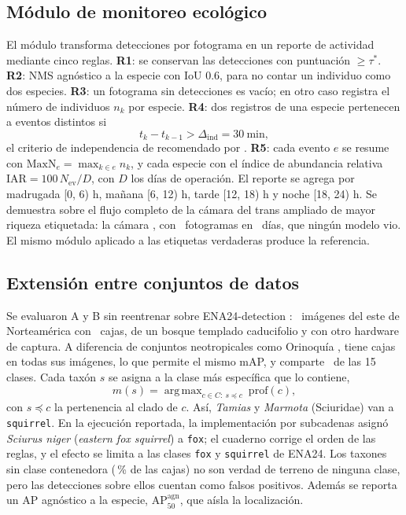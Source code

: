\documentclass{article}
\DeclareMathOperator*{\argmax}{arg\,max}
\begin{document}
\subsection{Módulo de monitoreo ecológico}
\label{sec:monitoreo}
El módulo transforma detecciones por fotograma en un reporte de actividad mediante cinco reglas. \textbf{R1}: se conservan las detecciones con puntuación \(\ge \tau^\ast\). \textbf{R2}: NMS agnóstico a la especie con IoU 0.6, para no contar un individuo como dos especies. \textbf{R3}: un fotograma sin detecciones es vacío; en otro caso registra el número de individuos \(n_k\) por especie. \textbf{R4}: dos registros de una especie pertenecen a eventos distintos si
\begin{equation}
  t_k - t_{k-1} > \Delta_{\mathrm{ind}} = 30\ \text{min},
  \label{eq:evento}
\end{equation}
el criterio de independencia de \textcite{obrien2003} recomendado por \textcite{meek2014}. \textbf{R5}: cada evento \(e\) se resume con \(\mathrm{MaxN}_e = \max_{k\in e} n_k\), y cada especie con el índice de abundancia relativa \(\mathrm{IAR} = 100\, N_{\mathrm{ev}}/D\), con \(D\) los días de operación. El reporte se agrega por madrugada [0, 6) h, mañana [6, 12) h, tarde [12, 18) h y noche [18, 24) h. Se demuestra sobre el flujo completo de la cámara del trans ampliado de mayor riqueza etiquetada: la cámara \locDemo, con \fotogramasDemo\ fotogramas en \diasDemo\ días, que ningún modelo vio. El mismo módulo aplicado a las etiquetas verdaderas produce la referencia.

\subsection{Extensión entre conjuntos de datos}
\label{sec:ena24}
Se evaluaron A y B sin reentrenar sobre ENA24-detection \parencite{yousif2019}: \nEna\ imágenes del este de Norteamérica con \nCajasEna\ cajas, de un bosque templado caducifolio y con otro hardware de captura. A diferencia de conjuntos neotropicales como Orinoquía \parencite{velez2023}, tiene cajas en todas sus imágenes, lo que permite el mismo mAP, y comparte \nClasesEna\ de las 15 clases. Cada taxón \(s\) se asigna a la clase más específica que lo contiene,
\begin{equation}
  m(s) = \argmax_{c \in C:\ s \preceq c}\ \mathrm{prof}(c),
  \label{eq:mapeo}
\end{equation}
con \(s \preceq c\) la pertenencia al clado de \(c\). Así, \emph{Tamias} y \emph{Marmota} (Sciuridae) van a \texttt{squirrel}. En la ejecución reportada, la implementación por subcadenas asignó \emph{Sciurus niger} (\emph{eastern fox squirrel}) a \texttt{fox}; el cuaderno corrige el orden de las reglas, y el efecto se limita a las clases \texttt{fox} y \texttt{squirrel} de ENA24. Los taxones sin clase contenedora (\pctNoMapeadas\,\% de las cajas) no son verdad de terreno de ninguna clase, pero las detecciones sobre ellos cuentan como falsos positivos. Además se reporta un AP agnóstico a la especie, AP\(^{\mathrm{agn}}_{50}\), que aísla la localización.
\end{document}
